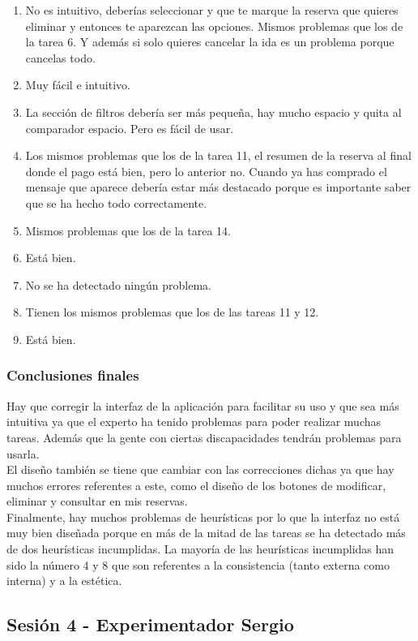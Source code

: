 \begin{enumerate}
    \item No es intuitivo, deberías seleccionar y que te marque la reserva que quieres eliminar y entonces te aparezcan las opciones. Mismos problemas que los de la tarea 6. Y además si solo quieres cancelar la ida es un problema porque cancelas todo.
    \item Muy fácil e intuitivo.
    \item La sección de filtros debería ser más pequeña, hay mucho espacio y quita al comparador espacio. Pero es fácil de usar.
    \item Los mismos problemas que los de la tarea 11, el resumen de la reserva al final donde el pago está bien, pero lo anterior no. Cuando ya has comprado el mensaje que aparece debería estar más destacado porque es importante saber que se ha hecho todo correctamente.
    \item Mismos problemas que los de la tarea 14.
    \item Está bien.
    \item No se ha detectado ningún problema.
    \item Tienen los mismos problemas que los de las tareas 11 y 12.
    \item Está bien. 
\end{enumerate}


\subsubsection{Conclusiones finales}
Hay que corregir la interfaz de la aplicación para facilitar su uso y que sea más intuitiva ya que el experto ha tenido problemas para 
poder realizar muchas tareas. Además que la gente con ciertas discapacidades tendrán problemas para usarla. \\

El diseño también se tiene que cambiar con las correcciones dichas ya que hay muchos errores referentes a este, como el diseño de los botones de modificar, eliminar 
y consultar en mis reservas. \\

Finalmente, hay muchos problemas de heurísticas por lo que la interfaz no está muy bien diseñada porque en más de la mitad de las tareas se ha detectado más de dos 
heurísticas incumplidas. La mayoría de las heurísticas incumplidas han sido la número 4 y 8 que son referentes a la consistencia (tanto externa como interna) y a 
la estética.

\subsection{Sesión 4 - Experimentador Sergio}
